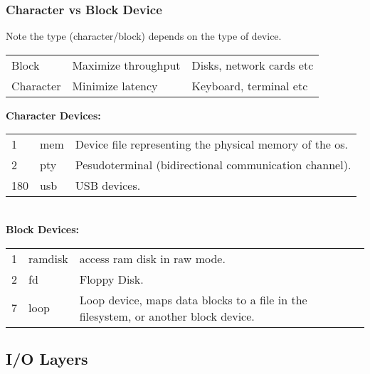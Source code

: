 \documentclass{report}
\begin{document}
            \subsubsection*{Character vs Block Device}
                Note the type (character/block) depends on the type of device.
                \begin{center}
                    \begin{tabular}{l l l}
                        Block & Maximize throughput & Disks, network cards etc \\
                        Character & Minimize latency & Keyboard, terminal etc \\
                    \end{tabular}
                \end{center}
                \textbf{Character Devices:}
                \\ \begin{tabular}{l l l}
                    1 & mem & Device file representing the physical memory of the os. \\
                    2 & pty & Pesudoterminal (bidirectional communication channel). \\
                    180 & usb & USB devices. \\
                \end{tabular}
                \\ \textbf{Block Devices:}
                \\ \begin{tabular}{l l l}
                    1 & ramdisk & access ram disk in raw mode. \\
                    2 & fd & Floppy Disk. \\
                    7 & loop & Loop device, maps data blocks to a file in the filesystem, or another block device. \\
                \end{tabular}
                
        \subsection*{I/O Layers}
\end{document}
